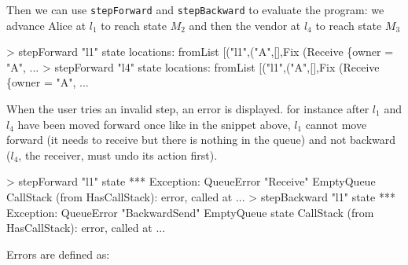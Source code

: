 \documentclass[runningheads,plain]{llncs}
\newenvironment{Shaded}{}{}
\newcommand{\DataTypeTok}[1]{\textcolor[rgb]{0.56,0.13,0.00}{#1}}
\newcommand{\StringTok}[1]{\textcolor[rgb]{0.25,0.44,0.63}{#1}}
\newcommand{\FunctionTok}[1]{\textcolor[rgb]{0.02,0.16,0.49}{#1}}
\newcommand{\NormalTok}[1]{#1}
\begin{document}
Then we can use \texttt{stepForward} and \texttt{stepBackward} to
evaluate the program: we advance Alice at $l_1$ to reach state $M_2$ and then the vendor at $l_4$ to reach state $M_3$

\begin{Shaded}
\begin{Highlighting}[]
\FunctionTok{>}\NormalTok{ stepForward }\StringTok{"l1"}\NormalTok{ state}
\NormalTok{locations}\FunctionTok{:}\NormalTok{ fromList [(}\StringTok{"l1"}\NormalTok{,(}\StringTok{"A"}\NormalTok{,[],}\DataTypeTok{Fix}\NormalTok{ (}\DataTypeTok{Receive}\NormalTok{ \{owner }\FunctionTok{=} \StringTok{"A"}\NormalTok{, }\FunctionTok{...} 
\FunctionTok{>}\NormalTok{ stepForward }\StringTok{"l4"}\NormalTok{ state }
\NormalTok{locations}\FunctionTok{:}\NormalTok{ fromList [(}\StringTok{"l1"}\NormalTok{,(}\StringTok{"A"}\NormalTok{,[],}\DataTypeTok{Fix}\NormalTok{ (}\DataTypeTok{Receive}\NormalTok{ \{owner }\FunctionTok{=} \StringTok{"A"}\NormalTok{, }\FunctionTok{...} 
\end{Highlighting}
\end{Shaded}

When the user tries an invalid step, an error is displayed. for instance
after \(l_1\) and \(l_4\) have been moved forward once like in the
snippet above, \(l_1\) cannot move forward (it needs to receive but
there is nothing in the queue) and not backward (\(l_4\), the receiver,
must undo its action first).

\begin{Shaded}
\begin{Highlighting}[]
\FunctionTok{>}\NormalTok{ stepForward }\StringTok{"l1"}\NormalTok{ state}
\FunctionTok{***} \DataTypeTok{Exception}\FunctionTok{:} \DataTypeTok{QueueError} \StringTok{"Receive"} \DataTypeTok{EmptyQueue}
\DataTypeTok{CallStack}\NormalTok{ (from }\DataTypeTok{HasCallStack}\NormalTok{)}\FunctionTok{:}
\NormalTok{  error, called at }\FunctionTok{...} 
\FunctionTok{>}\NormalTok{ stepBackward }\StringTok{"l1"}\NormalTok{ state}
\FunctionTok{***} \DataTypeTok{Exception}\FunctionTok{:} \DataTypeTok{QueueError} \StringTok{"BackwardSend"} \DataTypeTok{EmptyQueue}\NormalTok{ state}
\DataTypeTok{CallStack}\NormalTok{ (from }\DataTypeTok{HasCallStack}\NormalTok{)}\FunctionTok{:}
\NormalTok{  error, called at }\FunctionTok{...} 
\end{Highlighting}
\end{Shaded}

Errors are defined as:
\end{document}
